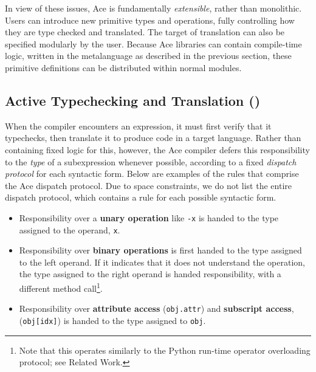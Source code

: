 \documentclass[10pt, conference, compsocconf]{IEEEtran}
\begin{document}
In view of these issues, Ace is fundamentally {\em extensible}, rather than monolithic. Users can introduce new primitive types and operations, fully controlling how they are type checked and translated. The target of translation can also be specified modularly by the user. Because Ace libraries can contain compile-time logic, written in the metalanguage as described in the previous section, these primitive definitions can be distributed within normal modules.

\subsection{Active Typechecking and Translation (\ATT)}

When the compiler encounters an expression, it must first verify that it typechecks, then translate it to produce code in a target language. Rather than containing fixed logic for this, however, the Ace compiler defers this responsibility to the {\it type} of a subexpression whenever possible, according to a fixed {\em dispatch protocol} for each syntactic form. Below are examples of the rules that comprise the Ace dispatch protocol. Due to space constraints, we do not list the entire dispatch protocol, which contains a rule for each possible syntactic form.
\begin{itemize}
\item Responsibility over a {\bf unary operation} like \verb|-x| is handed to the type assigned to the operand, \verb|x|.
\item Responsibility over {\bf binary operations} is first handed to the type assigned to the left operand. If it indicates that it does not understand the operation, the type assigned to the right operand is handed responsibility, with a different method call\footnote{Note that this operates similarly to the Python run-time operator overloading protocol; see Related Work.}.
\item Responsibility over {\bf attribute access} (\texttt{obj.attr}) and {\bf subscript access}, (\texttt{obj[idx]}) is handed to the type assigned to \texttt{obj}.
\end{itemize}
\end{document}
